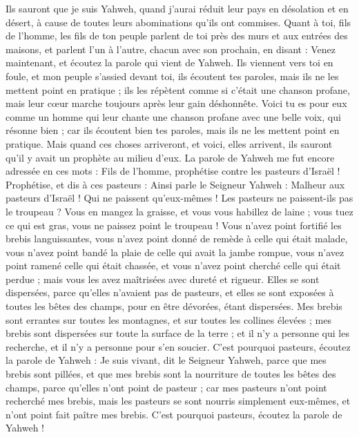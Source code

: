 \begin{multicols}{2}
Ils sauront que je suis Yahweh, quand j'aurai réduit leur pays en désolation et en désert, à cause de toutes leurs abominations qu'ils ont commises.
Quant à toi, fils de l’homme, les fils de ton peuple parlent de toi près des murs et aux entrées des maisons, et parlent l'un à l'autre, chacun avec son prochain, en disant : Venez maintenant, et écoutez la parole qui vient de Yahweh.
Ils viennent vers toi en foule, et mon peuple s'assied devant toi, ils écoutent tes paroles, mais ils ne les mettent point en pratique ; ils les répètent comme si c'était une chanson profane, mais leur cœur marche toujours après leur gain déshonnête.
Voici tu es pour eux comme un homme qui leur chante une chanson profane avec une belle voix, qui résonne bien ; car ils écoutent bien tes paroles, mais ils ne les mettent point en pratique.
Mais quand ces choses arriveront, et voici, elles arrivent,  ils sauront qu'il y avait un prophète au milieu d'eux.
\VerseOne{}La parole de Yahweh me fut encore adressée en ces mots :
Fils de l’homme, prophétise contre les pasteurs d'Israël\FTNT{} ! Prophétise, et dis à ces pasteurs : Ainsi parle le Seigneur Yahweh : Malheur aux pasteurs d'Israël ! Qui ne paissent qu'eux-mêmes ! Les pasteurs ne paissent-ils pas le troupeau ?
Vous en mangez la graisse, et vous vous habillez de laine ; vous tuez ce qui est gras, vous ne paissez point le troupeau !
Vous n'avez point fortifié les brebis languissantes, vous n'avez point donné de remède à celle qui était malade, vous n'avez point bandé la plaie de celle qui avait la jambe rompue, vous n'avez point ramené celle qui était chassée, et vous n'avez point cherché celle qui était perdue\FTNT{} ; mais vous les avez maîtrisées avec dureté et rigueur.
Elles se sont dispersées, parce qu’elles n’avaient pas de pasteurs, et elles se sont exposées à toutes les bêtes des champs, pour en être dévorées, étant dispersées.
Mes brebis sont errantes sur toutes les montagnes, et sur toutes les collines élevées ; mes brebis sont dispersées sur toute la surface de la terre ; et il n'y a personne qui les recherche, et il n'y a personne pour s'en soucier\FTNT{}.
C'est pourquoi pasteurs, écoutez la parole de Yahweh :
Je suis vivant, dit le Seigneur Yahweh, parce que mes brebis sont pillées, et que mes brebis sont la nourriture de toutes les bêtes des champs, parce qu'elles n’ont point de pasteur ; car mes pasteurs n'ont point recherché mes brebis, mais les pasteurs se sont nourris simplement eux-mêmes, et n'ont point fait paître mes brebis.
C'est pourquoi pasteurs, écoutez la parole de Yahweh !

\end{multicols}
